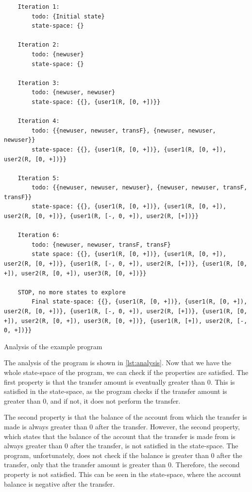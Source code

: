 \begin{listing}[htb!]
    \begin{verbatim}
    Iteration 1:
        todo: {Initial state}
        state-space: {}

    Iteration 2:
        todo: {newuser}
        state-space: {}

    Iteration 3:
        todo: {newuser, newuser}
        state-space: {{}, {user1(R, [0, +])}}

    Iteration 4:
        todo: {{newuser, newuser, transF}, {newuser, newuser, newuser}}
        state-space: {{}, {user1(R, [0, +])}, {user1(R, [0, +]), user2(R, [0, +])}}

    Iteration 5:
        todo: {{newuser, newuser, newuser}, {newuser, newuser, transF, transF}}
        state-space: {{}, {user1(R, [0, +])}, {user1(R, [0, +]), user2(R, [0, +])}, {user1(R, [-, 0, +]), user2(R, [+])}}

    Iteration 6:
        todo: {newuser, newuser, transF, transF}
        state space: {{}, {user1(R, [0, +])}, {user1(R, [0, +]), user2(R, [0, +])}, {user1(R, [-, 0, +]), user2(R, [+])}, {user1(R, [0, +]), user2(R, [0, +]), user3(R, [0, +])}}

    STOP, no more states to explore
        Final state-space: {{}, {user1(R, [0, +])}, {user1(R, [0, +]), user2(R, [0, +])}, {user1(R, [-, 0, +]), user2(R, [+])}, {user1(R, [0, +]), user2(R, [0, +]), user3(R, [0, +])}, {user1(R, [+]), user2(R, [-, 0, +])}}
    \end{verbatim}
    \caption{Analysis of the example program}
    \label{lst:analysis}
\end{listing}


The analysis of the program is shown in \autoref{lst:analysis}.
Now that we have the whole state-space of the program, we can check if the properties are satisfied.
The first property is that the transfer amount is eventually greater than 0.
This is satisfied in the state-space, as the program checks if the transfer amount is greater than 0, and if not, it does not perform the transfer.

The second property is that the balance of the account from which the transfer is made is always greater than 0 after the transfer.
However, the second property, which states that the balance of the account that the transfer is made from is always greater than 0 after the transfer, is not satisfied in the state-space.
The program, unfortunately, does not check if the balance is greater than 0 after the transfer, only that the transfer amount is greater than 0.
Therefore, the second property is not satisfied.
This can be seen in the state-space, where the account balance is negative after the transfer.
